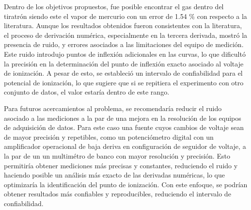 
Dentro de los objetivos propuestos, fue posible encontrar el gas dentro del tiratrón siendo este el vapor de mercurio con un error de 1.54 \% con respecto a la literatura. Aunque los resultados obtenidos fueron consistentes con la literatura, el proceso de derivación numérica, especialmente en la tercera derivada, mostró la presencia de ruido, y errores asociados a las limitaciones del equipo de medición. Este ruido introdujo puntos de inflexión adicionales en las curvas, lo que dificultó la precisión en la determinación del punto de inflexión exacto asociado al voltaje de ionización. A pesar de esto, se estableció un intervalo de confiabilidad para el potencial de ionización, lo que sugiere que si se repitiera el experimento con otro conjunto de datos, el valor estaría dentro de este rango.

Para futuros acercamientos al problema, se recomendaría reducir el ruido asociado a las mediciones a la par de una mejora en la resolución de los equipos de adquisición de datos. Para este caso una fuente cuyos cambios de voltaje sean de mayor precisión y repetibles, como un potenciómetro digital con un amplificador operacional de baja deriva en configuración de seguidor de voltaje, a la par de un un multimétro de banco con mayor resolución y precisión. Esto permitiría obtener mediciones más precisas y constantes, reduciendo el ruido y haciendo posible un análisis más exacto de las derivadas numéricas, lo que optimizaría la identificación del punto de ionización. Con este enfoque, se podrían obtener resultados más confiables y reproducibles, reduciendo el intervalo de confiabilidad.